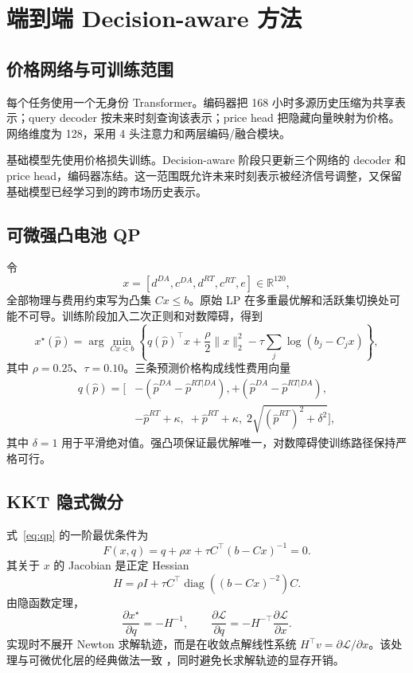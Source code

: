 \documentclass[UTF8,a4paper,11pt,fontset=fandol]{ctexart}
\newcommand{\R}{\mathbb{R}}
\begin{document}
\section{端到端 Decision-aware 方法}

\subsection{价格网络与可训练范围}

每个任务使用一个无身份 Transformer。编码器把 168 小时多源历史压缩为共享表示；query decoder 按未来时刻查询该表示；price head 把隐藏向量映射为价格。网络维度为 128，采用 4 头注意力和两层编码/融合模块。

基础模型先使用价格损失训练。Decision-aware 阶段只更新三个网络的 decoder 和 price head，编码器冻结。这一范围既允许未来时刻表示被经济信号调整，又保留基础模型已经学习到的跨市场历史表示。

\subsection{可微强凸电池 QP}

令
\[
x=
\left[
d^{DA},c^{DA},d^{RT},c^{RT},e
\right]\in\R^{120},
\]
全部物理与费用约束写为凸集 $Cx\le b$。原始 LP 在多重最优解和活跃集切换处可能不可导。训练阶段加入二次正则和对数障碍，得到
\begin{equation}
x^\star(\hat p)
=
\arg\min_{Cx<b}
\left\{
q(\hat p)^\top x
+\frac{\rho}{2}\|x\|_2^2
-\tau\sum_j\log(b_j-C_jx)
\right\},
\label{eq:qp}
\end{equation}
其中 $\rho=0.25$、$\tau=0.10$。三条预测价格构成线性费用向量
\begin{equation}
\begin{aligned}
q(\hat p)=\big[
&-(\hat p^{DA}-\hat p^{RT|DA}),
+(\hat p^{DA}-\hat p^{RT|DA}),\\
&-\hat p^{RT}+\kappa,\;
+\hat p^{RT}+\kappa,\;
2\sqrt{(\hat p^{RT})^2+\delta^2}
\big],
\end{aligned}
\end{equation}
其中 $\delta=1$ 用于平滑绝对值。强凸项保证最优解唯一，对数障碍使训练路径保持严格可行。

\subsection{KKT 隐式微分}

式~\eqref{eq:qp} 的一阶最优条件为
\begin{equation}
F(x,q)
=
q+\rho x+\tau C^\top(b-Cx)^{-1}
=0.
\end{equation}
其关于 $x$ 的 Jacobian 是正定 Hessian
\begin{equation}
H
=
\rho I+
\tau C^\top
\operatorname{diag}\!\left((b-Cx)^{-2}\right)C.
\end{equation}
由隐函数定理，
\begin{equation}
\frac{\partial x^\star}{\partial q}
=-H^{-1},
\qquad
\frac{\partial \mathcal L}{\partial q}
=-H^{-\top}\frac{\partial \mathcal L}{\partial x}.
\label{eq:implicit}
\end{equation}
实现时不展开 Newton 求解轨迹，而是在收敛点解线性系统
$H^\top v=\partial\mathcal L/\partial x$。该处理与可微优化层的经典做法一致
\cite{amos2017,agrawal2019}，同时避免长求解轨迹的显存开销。
\end{document}
